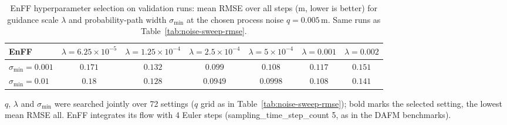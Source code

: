 \begin{table}[ht]
\centering
\small
\caption{EnFF hyperparameter selection on validation runs: mean RMSE over all steps (m, lower is better) for guidance scale $\lambda$ and probability-path width $\sigma_{\min}$ at the chosen process noise $q{=}0.005$\,m. Same runs as Table~\ref{tab:noise-sweep-rmse}.}
\label{tab:enff-sweep}
\begin{adjustbox}{max width=\linewidth}
\begin{tabular}{lcccccc}
\toprule
EnFF & $\lambda{=}6.25\times10^{-5}$ & $\lambda{=}1.25\times10^{-4}$ & $\lambda{=}2.5\times10^{-4}$ & $\lambda{=}5\times10^{-4}$ & $\lambda{=}0.001$ & $\lambda{=}0.002$ \\
\midrule
$\sigma_{\min}{=}0.001$ & $0.171$ & $0.132$ & $0.099$ & $0.108$ & $0.117$ & $0.151$ \\
$\sigma_{\min}{=}0.01$ & $0.18$ & $0.128$ & $\mathbf{0.0949}$ & $0.0998$ & $0.108$ & $0.141$ \\
\bottomrule
\end{tabular}
\end{adjustbox}
\par\smallskip\parbox{0.95\linewidth}{\footnotesize $q$, $\lambda$ and $\sigma_{\min}$ were searched jointly over 72 settings ($q$ grid as in Table~\ref{tab:noise-sweep-rmse}); bold marks the selected setting, the lowest mean RMSE all. EnFF integrates its flow with 4 Euler steps (sampling\_time\_step\_count 5, as in the DAFM benchmarks).}
\end{table}
